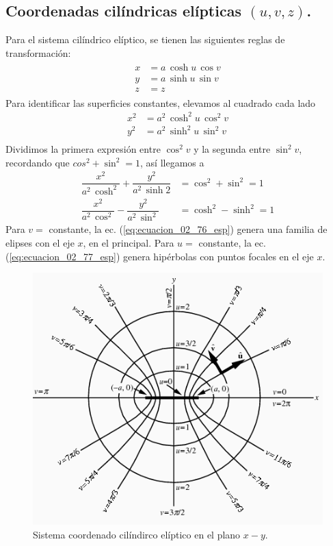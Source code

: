  \subsection{Coordenadas cilíndricas elípticas $(u, v, z)$.}
 Para el sistema cilíndrico elíptico, se tienen las siguientes reglas de transformación:
\begin{align}
\begin{aligned}
x &= a \, \cosh u \, \cos v \\
y &= a \, \sinh u \, \sin v \\
z &= z
\end{aligned}
\label{eq:ecuacion_02_73_esp}
\end{align}
Para identificar las superficies constantes, elevamos al cuadrado cada lado
\begin{align}
x^{2} &= a^{2} \, \cosh^{2} u \, \cos^{2} v \label{eq:ecuacion_02_74_esp} \\
y^{2} &= a^{2} \, \sinh^{2} u \, \sin^{2} v \label{eq:ecuacion_02_75_esp} \\ 
\end{align}
Dividimos la primera expresión entre $\cos^{2} v$ y la segunda entre $\sin^{2} v$, recordando que $cos^{2} + \sin^{2} = 1$, así llegamos a
\begin{align}
\dfrac{x^{2}}{a^{2} \, \cosh^{2}} + \dfrac{y^{2}}{a^{2} \, \sinh{2}} &= \cos^{2} + \sin^{2} = 1 \label{eq:ecuacion_02_76_esp}\\[1em]
\dfrac{x^{2}}{a^{2} \, \cos^{2}} - \dfrac{y^{2}}{a^{2} \, \sin^{2}} &= \cosh^{2} - \sinh^{2} = 1 \label{eq:ecuacion_02_77_esp}
\end{align}
Para $v=$ constante, la ec. (\ref{eq:ecuacion_02_76_esp}) genera una familia de elipses con el eje $x$, en el principal. Para $u=$ constante, la ec. (\ref{eq:ecuacion_02_77_esp}) genera hipérbolas con puntos focales en el eje $x$.
\begin{figure}[H]
    \centering
    \includegraphics[scale=0.75]{Imagenes/EllipticCylindricalCoord_1000.png}
    \caption{Sistema coordenado cilíndirco elíptico en el plano $x-y$.}
    \label{fig:figura_coordenada_cilindricas_elipticas}
\end{figure}
